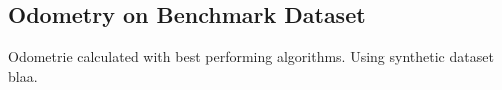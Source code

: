 \subsection{Odometry on Benchmark Dataset}

Odometrie calculated with best performing algorithms.
Using synthetic dataset blaa.
